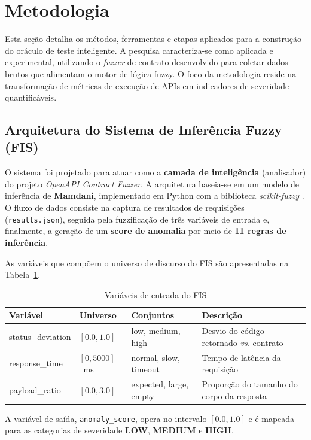 \section{Metodologia}

Esta seção detalha os métodos, ferramentas e etapas aplicados para a construção do oráculo de teste inteligente. A pesquisa caracteriza-se como aplicada e experimental, utilizando o \textit{fuzzer} de contrato desenvolvido para coletar dados brutos que alimentam o motor de lógica fuzzy. O foco da metodologia reside na transformação de métricas de execução de APIs em indicadores de severidade quantificáveis.

\subsection{Arquitetura do Sistema de Inferência Fuzzy (FIS)}

O sistema foi projetado para atuar como a \textbf{camada de inteligência} (analisador) do projeto \textit{OpenAPI Contract Fuzzer}. A arquitetura baseia-se em um modelo de inferência de \textbf{Mamdani}, implementado em Python com a biblioteca \textit{scikit-fuzzy} \cite{scikitfuzzy}. O fluxo de dados consiste na captura de resultados de requisições (\texttt{results.json}), seguida pela fuzzificação de três variáveis de entrada e, finalmente, a geração de um \textbf{score de anomalia} por meio de \textbf{11 regras de inferência}.

As variáveis que compõem o universo de discurso do FIS são apresentadas na Tabela~\ref{tab:variaveis}.

\begin{table}[H]
\centering
\caption{Variáveis de entrada do FIS}
\label{tab:variaveis}
\footnotesize
\begin{tabular}{@{}lllp{6.5cm}@{}}
\hline
\textbf{Variável} & \textbf{Universo} & \textbf{Conjuntos} & \textbf{Descrição} \\
\hline
status\_deviation & $[0.0, 1.0]$ & low, medium, high & Desvio do código retornado \textit{vs.} contrato \\
response\_time & $[0, 5000]$~ms & normal, slow, timeout & Tempo de latência da requisição \\
payload\_ratio & $[0.0, 3.0]$ & expected, large, empty & Proporção do tamanho do corpo da resposta \\
\hline
\end{tabular}
\end{table}

A variável de saída, \texttt{anomaly\_score}, opera no intervalo $[0.0, 1.0]$ e é mapeada para as categorias de severidade \textbf{LOW}, \textbf{MEDIUM} e \textbf{HIGH}.

